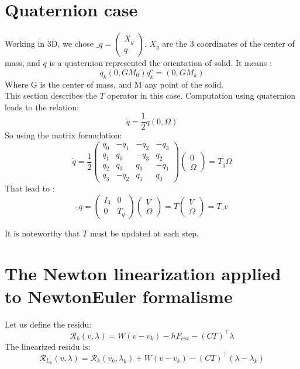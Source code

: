 \section{Quaternion case}
Working in 3D, we chose $\_q= \left(\begin{array}{l} X_g \\q \end{array}\right) $. $X_g$ are the 3 coordinates of the center of mass, and $q$ is a quaternion
  represented the orientation of solid. It means :
  \[q_k(0,GM_0)q_k^c = (0,GM_k)\]
Where G is the center of mass, and M any point of the solid.\\
This section describes the $T$ operator in this case. Computation using quaternion leads to the relation:
\[\dot q = \frac{1}{2} q (0,\Omega)\]
So using the matrix formulation:
\[\dot q = \frac{1}{2}  \left(\begin{array}{cccc} q_0&-q_1&-q_2&-q_3 \\ q_1&q_0&-q_3&q_2\\
  q_2&q_3&q_0&-q_1\\ q_3&-q_2&q_1&q_0\end{array}\right)  \left(\begin{array}{c} 0 \\ \Omega
  \end{array}\right) =
  T_q   \Omega  \]
  That lead to :
  \[ \dot \_q = \left(\begin{array}{cc} I_3 & 0 \\ 0 &
  T_q \end{array}\right) \left(\begin{array}{c} V\\ \Omega  \end{array}\right)  = T
  \left(\begin{array}{c} V\\ \Omega  \end{array}\right)=T \_v\]

It is noteworthy that $T$ must be updated at each step.

\section{The Newton linearization applied to NewtonEuler formalisme}
  Let us define the residu:
\begin{equation}
  \label{eq:newton_NE1_residu}
  \mathcal R_k (v,\lambda) =W(v-v_k)-hF_{ext}-(CT)^\top\lambda
\end{equation}
The linearized residu is:
\begin{equation}
  \label{eq:newton_NE1_residuL}
  \mathcal R_{L_k} (v,\lambda) =\mathcal R_k (v_k,\lambda_k)+W(v-v_k)-(CT)^\top(\lambda - \lambda_k)
\end{equation}

